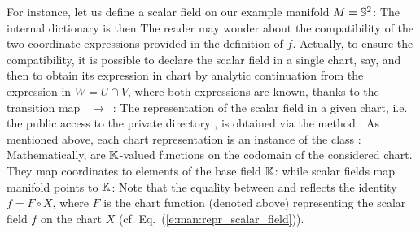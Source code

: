 For instance, let us define a scalar field on our example manifold $M=\mathbb{S}^2$:
The internal dictionary  is then
The reader may wonder about the compatibility of the two coordinate expressions
provided in the definition of $f$. Actually, to ensure the compatibility, it
is possible to declare the scalar field in a single chart,  say,
and then to obtain its expression in chart  by analytic continuation
from the expression in $W=U\cap V$, where both expressions are known, thanks
to the transition map ~$\to$~:
The representation of the scalar field in a given chart, i.e. the public access
to the private directory , is obtained via the method :
As mentioned above, each chart representation is an instance of the
class :
Mathematically,  are $\mathbb{K}$-valued functions on the codomain of
the considered chart. They map coordinates to elements of the base field $\mathbb{K}$:
while scalar fields map manifold points to $\mathbb{K}$:
Note that the equality between  and 
reflects the identity $f = F \circ X$, where $F$ is the chart function
(denoted  above)
representing the scalar field $f$ on the chart $X$
(cf. Eq.~(\ref{e:man:repr_scalar_field})).

